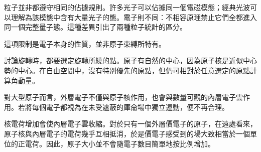 粒子並非都遵守相同的佔據規則。許多光子可以佔據同一個電磁模態；經典光波可以理解為該模態中含有大量光子的態。電子則不同：不相容原理禁止它們全都進入同一個完整量子態。這種差異引出了兩種粒子統計的區分。

\begin{classroomqa}
\end{classroomqa}

這項限制是電子本身的性質，並非原子束縛所特有。

\begin{classroomqa}
\end{classroomqa}

討論旋轉時，都要選定旋轉所繞的點。原子有自然的中心，因為原子核是近似中心勢的中心。在自由空間中，沒有特別優先的原點，但仍可相對於任意選定的原點計算角動量。

\begin{classroomqa}
\end{classroomqa}

對大型原子而言，外層電子不僅與原子核作用，也會與數量可觀的內層電子雲作用。若將每個電子都視為在未受遮蔽的庫侖場中獨立運動，便不再合理。

\begin{classroomqa}
\end{classroomqa}

核電荷增加會使內層電子雲收縮。對於只有一個外層價電子的原子，在遠處看來，原子核與內層電子的電荷幾乎互相抵消，於是價電子感受到的場大致相當於一個單位的正電荷。因此，原子大小並不會隨電子數目簡單地按比例增加。

\begin{classroomqa}
\end{classroomqa}

